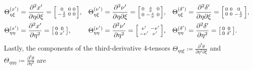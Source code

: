 \documentclass{article}
\begin{document}
\begin{align}
  \Theta_{\eta\xi}^{(x')}                                                                                           & = \frac{\partial^2 x'}{\partial \eta \partial \xi} = \begin{bsmallmatrix} 0 & 0 & 0 \\ -\frac{1}{\sigma} & 0 & 0 \end{bsmallmatrix}, &   &
  \Theta_{\eta\xi}^{(\nu')} = \frac{\partial^2 \nu'}{\partial \eta \partial \xi} = \begin{bsmallmatrix} 0 & \frac{s}{\sigma} & 0 \\ 0 & -\frac{s}{\sigma} & 0 \end{bsmallmatrix}, &                                                                                       &
  \Theta_{\eta\xi}^{(\delta')} = \frac{\partial^2 \delta'}{\partial \eta \partial \xi} = \begin{bsmallmatrix} 0 & 0 & 0 \\ 0 & 0 & -\frac{1}{\sigma} \end{bsmallmatrix},                                                                                         \\
  \Theta_{\eta\eta}^{(x')}                                                                                          & = \frac{\partial^2 x'}{\partial \eta^2} = \begin{bsmallmatrix} 0 & 0 \\ 0 & x' \end{bsmallmatrix},            &   &
  \Theta_{\eta\eta}^{(\nu')} = \frac{\partial^2 \nu'}{\partial \eta^2} = \begin{bsmallmatrix} \nu' & -\nu' \\ -\nu' & \nu' \end{bsmallmatrix},           &                                                                                       &
  \Theta_{\eta\eta}^{(\delta')} = \frac{\partial^2 \delta'}{\partial \eta^2} = \begin{bsmallmatrix} 0 & 0 \\ 0 & \delta' \end{bsmallmatrix}.
\end{align}
%
Lastly, the components of the third-derivative 4-tensors
$\Theta_{\eta\eta\xi} \coloneqq \frac{\partial^3 \theta}{\partial \eta^2 \partial \xi}$ and $\Theta_{\eta\eta\eta} \coloneqq \frac{\partial^3 \theta}{\partial \eta^3}$ are
%
\end{document}
